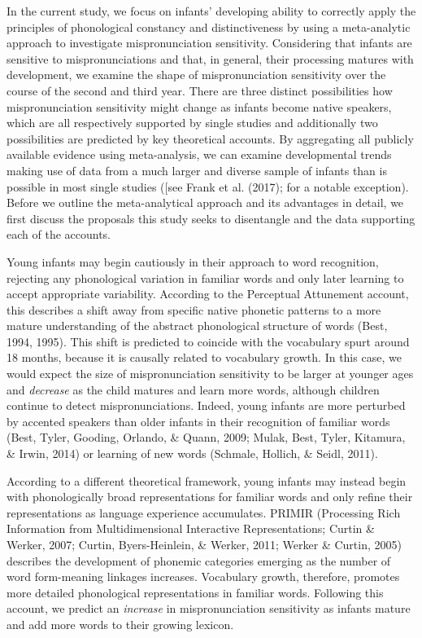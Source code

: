 \documentclass[man]{apa6}
\theoremstyle{definition}
\theoremstyle{definition}
\theoremstyle{definition}
\theoremstyle{remark}
\begin{document}
In the current study, we focus on infants' developing ability to
correctly apply the principles of phonological constancy and
distinctiveness by using a meta-analytic approach to investigate
mispronunciation sensitivity. Considering that infants are sensitive to
mispronunciations and that, in general, their processing matures with
development, we examine the shape of mispronunciation sensitivity over
the course of the second and third year. There are three distinct
possibilities how mispronunciation sensitivity might change as infants
become native speakers, which are all respectively supported by single
studies and additionally two possibilities are predicted by key
theoretical accounts. By aggregating all publicly available evidence
using meta-analysis, we can examine developmental trends making use of
data from a much larger and diverse sample of infants than is possible
in most single studies ({[}see Frank et al. (2017); for a notable
exception). Before we outline the meta-analytical approach and its
advantages in detail, we first discuss the proposals this study seeks to
disentangle and the data supporting each of the accounts.

Young infants may begin cautiously in their approach to word
recognition, rejecting any phonological variation in familiar words and
only later learning to accept appropriate variability. According to the
Perceptual Attunement account, this describes a shift away from specific
native phonetic patterns to a more mature understanding of the abstract
phonological structure of words (Best, 1994, 1995). This shift is
predicted to coincide with the vocabulary spurt around 18 months,
because it is causally related to vocabulary growth. In this case, we
would expect the size of mispronunciation sensitivity to be larger at
younger ages and \emph{decrease} as the child matures and learn more
words, although children continue to detect mispronunciations. Indeed,
young infants are more perturbed by accented speakers than older infants
in their recognition of familiar words (Best, Tyler, Gooding, Orlando,
\& Quann, 2009; Mulak, Best, Tyler, Kitamura, \& Irwin, 2014) or
learning of new words (Schmale, Hollich, \& Seidl, 2011).

According to a different theoretical framework, young infants may
instead begin with phonologically broad representations for familiar
words and only refine their representations as language experience
accumulates. PRIMIR (Processing Rich Information from Multidimensional
Interactive Representations; Curtin \& Werker, 2007; Curtin,
Byers-Heinlein, \& Werker, 2011; Werker \& Curtin, 2005) describes the
development of phonemic categories emerging as the number of word
form-meaning linkages increases. Vocabulary growth, therefore, promotes
more detailed phonological representations in familiar words. Following
this account, we predict an \emph{increase} in mispronunciation
sensitivity as infants mature and add more words to their growing
lexicon.
\end{document}
